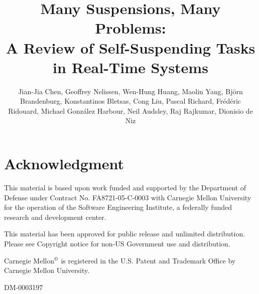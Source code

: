 



\papertrue 



\title{Many Suspensions, Many Problems:\\
A Review of Self-Suspending Tasks in Real-Time Systems}
\author{Jian-Jia Chen, Geoffrey Nelissen, Wen-Hung
  Huang, Maolin Yang, Bj\"orn Brandenburg,
  Konstantinos Bletsas, Cong Liu, Pascal
  Richard, Fr\'ed\'eric Ridouard, Michael Gonz\'alez
  Harbour, Neil Audsley,  Raj Rajkumar, Dionisio de Niz}

\maketitle  
 
 









\section{Acknowledgment}
This material is based upon work funded and supported by the Department of Defense under Contract No. FA8721-05-C-0003 with Carnegie Mellon University for the operation of the Software Engineering Institute, a federally funded research and development center.

 This material has been approved for public release and unlimited distribution. Please see Copyright notice for non-US Government use and distribution.

\noindent Carnegie Mellon$^\copyright$ is registered in the U.S. Patent and Trademark Office by Carnegie Mellon University.

\noindent DM-0003197

{}



